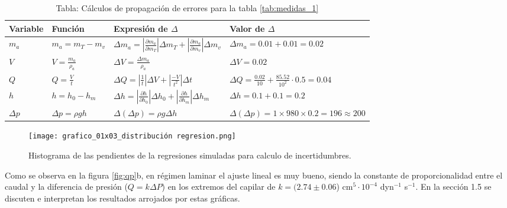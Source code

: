 \begin{table}[h]		
	\centering
	\renewcommand{\arraystretch}{1.5} %
	\begin{tabular}{|>{\centering\arraybackslash}m{1.5cm}|>{\centering\arraybackslash}m{2.5cm}|>{\centering\arraybackslash}m{5.5cm}|>{\centering\arraybackslash}m{5.5cm}|}
		\toprule
		\toprule
		\textbf{Variable} & \textbf{Función} & \textbf{Expresión de $\Delta$} & \textbf{Valor de $\Delta$} \\
		\hline
		$m_a$ & $m_a = m_T - m_v$ & $\Delta m_a = \left|\frac{\partial m_a}{\partial m_T}\right| \Delta m_T + \left|\frac{\partial m_a}{\partial m_v}\right| \Delta m_v$ & $\Delta m_a = 0.01 + 0.01 = 0.02$ \\
		\hline
		$V$ & $V = \frac{m_a}{\rho_a}$ & $\Delta V = \frac{\Delta m_a}{\rho_a}$ & $\Delta V = 0.02$ \\
		\hline
		$Q$ & $Q = \frac{V}{t}$ & $\Delta Q = \left|\frac{1}{t}\right| \Delta V + \left|\frac{-V}{t^2}\right| \Delta t$ & $\Delta Q = \frac{0.02}{10} + \frac{85.52}{10^2} \cdot 0.5 = 0.04$ \\
		\hline
		$h$ & $h = h_0 - h_m$ & $\Delta h = \left|\frac{\partial h}{\partial h_0}\right| \Delta h_0 + \left|\frac{\partial h}{\partial h_m}\right| \Delta h_m$ & $\Delta h = 0.1 + 0.1 = 0.2$ \\
		\hline
		$\Delta p$ & $\Delta p = \rho g h$ & $\Delta (\Delta p) = \rho g \Delta h$ & $\Delta (\Delta p) = 1 \times 980 \times 0.2 = 196 \approx 200$ \\
		\bottomrule
		\bottomrule
	\end{tabular}
	\caption{\footnotesize Tabla: Cálculos de propagación de errores para la tabla \ref{tab:medidas_1}}
	\label{tab:niceprop}
\end{table}


	
	
	\begin{figure}[H]
		\centering
		\begin{minipage}{0.42\textwidth} 
			\texttt{[image: grafico\_01x03\_distribución regresion.png]}
		\end{minipage}
		\caption{ \footnotesize Histograma de las pendientes de la regresiones simuladas para calculo de incertidumbres.}
		\label{fig:hist}
	\end{figure}

	
	Como se observa en la figura \ref{fig:qp}b, en régimen laminar el ajuste lineal es muy bueno, siendo la constante de proporcionalidad entre el caudal y la diferencia de presión ($Q=k\Delta P$) en los extremos del capilar de $k=(2.74\pm0.06$) cm$^5\cdot10^{-4}$ dyn$^{-1}$ s$^{-1}$. En la sección 1.5 se discuten e interpretan los resultados arrojados por estas gráficas.
	
